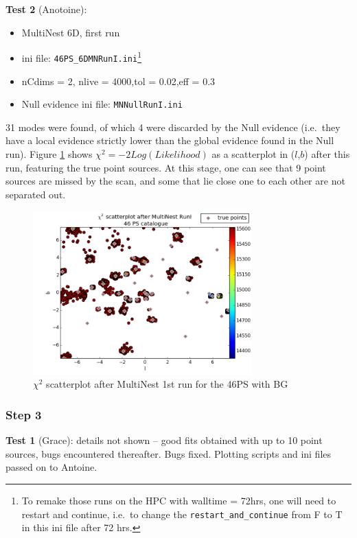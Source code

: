 \documentclass{article}
\begin{document}
\textbf{Test 2} (Anotoine):
\begin{itemize}
\item MultiNest 6D, first run
\item ini file: \verb=46PS_6DMNRunI.ini=\footnote{To remake those runs on the HPC with walltime = 72hrs, one will need to restart and continue, i.e.\ to change the \verb=restart_and_continue= from F to T in this ini file after 72 hrs.}
\item nCdims = 2, nlive = 4000,tol = 0.02,eff = 0.3
\item Null evidence ini file: \verb=MNNullRunI.ini=
\end{itemize}
31 modes were found, of which 4 were discarded by the Null evidence (i.e.\ they have a local evidence strictly lower than the global evidence found in the Null run). Figure \ref{fig:scatterplot46PSMNI} shows $\chi^{2} = - 2Log(Likelihood)$ as a scatterplot in ($l$,$b$) after this run, featuring the true point sources. At this stage, one can see that 9 point sources are missed by the scan, and some that lie close one to each other are not separated out.
\begin{figure}[h]
\centering
\includegraphics[clip = true,width=0.75\textwidth]{figs/scatplt46PSafterMNRunI.png}
\caption{$\chi^{2}$ scatterplot after MultiNest 1st run for the 46PS with BG\label{fig:scatterplot46PSMNI}}
\end{figure}

\subsubsection*{Step 3}

\textbf{Test 1} (Grace): details not shown -- good fits obtained with up to 10 point sources, bugs encountered thereafter.  Bugs fixed.  Plotting scripts and ini files passed on to Antoine.
\end{document}
